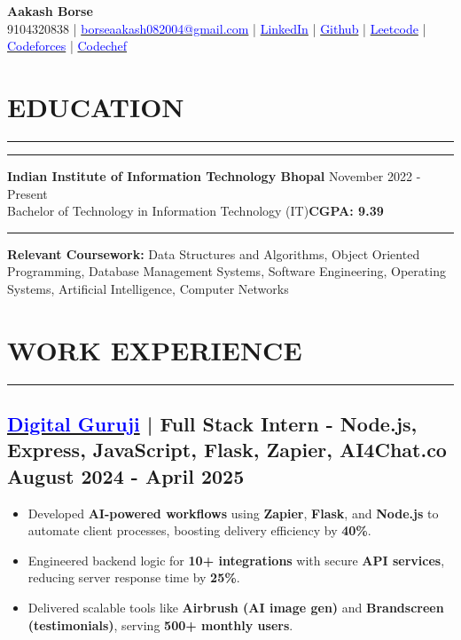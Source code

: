 \documentclass[a4paper]{article}
\newcommand{\sectionline}{
  \vspace{-2em} %
  \noindent\rule{\textwidth}{0.4pt}
  \vspace{0em} %
}
\newcommand{\verticalInd}{
  \vspace{-0.9em} %
  \noindent\rule{\textwidth}{0pt}
  \vspace{0em} %
}
\begin{document}
\begin{center}
\LARGE \textbf{Aakash Borse} \\
\vspace{5pt}
\normalsize
9104320838 | 
\href{mailto:borseaakash082004@gmail.com}{\textcolor{blue}{borseaakash082004@gmail.com}} |
\href{https://www.linkedin.com/in/aakash-borse-977077278/}{\textcolor{blue}{LinkedIn}} |
\href{https://github.com/aakash811}{\textcolor{blue}{Github}} |
\href{https://leetcode.com/u/aakash_811/}{\textcolor{blue}{Leetcode}} |
\href{https://codeforces.com/profile/Aakash_0880}{\textcolor{blue}{Codeforces}} |
\href{https://www.codechef.com/users/void_dear_68}{\textcolor{blue}{Codechef}}
\end{center}
\vspace{-1.5em}

\section*{EDUCATION}
\sectionline
\verticalInd
\textbf{Indian Institute of Information Technology Bhopal} \hfill November 2022 - Present \\
Bachelor of Technology in Information Technology (IT)\hfill \textbf{CGPA: 9.39}\\
\verticalInd
\textbf{Relevant Coursework:} Data Structures and Algorithms, Object Oriented Programming, Database Management Systems, Software Engineering, Operating Systems, Artificial Intelligence, Computer Networks\\
\vspace{-1.75em}

\section*{WORK EXPERIENCE}
\sectionline
\vspace{-2.25em}
\subsection*{\href{https://drive.google.com/file/d/1-d26qFdlom1rI3yVcRdyQUoUUeeGPar2/view?usp=sharing}{\textbf{\textcolor{blue}{Digital Guruji}}} | Full Stack Intern - Node.js, Express, JavaScript, Flask, Zapier, AI4Chat.co \hfill August 2024 - April 2025}
\vspace{-0.5em}
\begin{itemize}[leftmargin=*]
    \item Developed \textbf{AI-powered workflows} using \textbf{Zapier}, \textbf{Flask}, and \textbf{Node.js} to automate client processes, boosting delivery efficiency by \textbf{40\%}.
    \vspace{-0.5em}
    \item Engineered backend logic for \textbf{10+ integrations} with secure \textbf{API services}, reducing server response time by \textbf{25\%}.
    \vspace{-0.5em}
    \item Delivered scalable tools like \textbf{Airbrush (AI image gen)} and \textbf{Brandscreen (testimonials)}, serving \textbf{500+ monthly users}.
\end{itemize}
\vspace{-1.5em}
\end{document}
